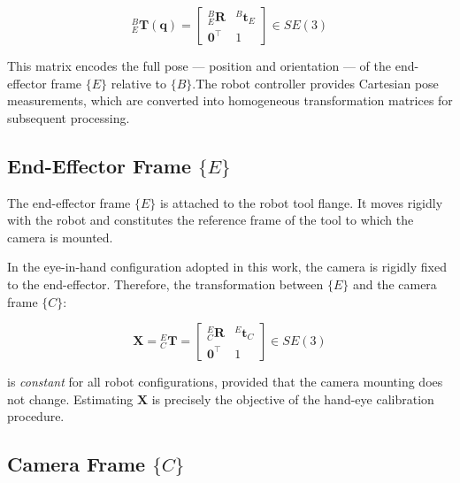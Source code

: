 \begin{equation}
    {}^B_E\mathbf{T}(\mathbf{q}) =
    \begin{bmatrix} {}^B_E\mathbf{R} & {}^B\mathbf{t}_E \\
    \mathbf{0}^{\top} & 1 \end{bmatrix} \in SE(3)
    \label{eq:T_BE}
\end{equation}

\noindent This matrix encodes the full pose — position and orientation — of the
end-effector frame $\{E\}$ relative to $\{B\}$.The robot controller provides Cartesian pose measurements, which are converted into homogeneous transformation matrices for subsequent processing.


\subsection{End-Effector Frame \texorpdfstring{$\{E\}$}{E}}
\label{subsec:frame_ee}

The end-effector frame $\{E\}$ is attached to the robot tool flange. It moves
rigidly with the robot and constitutes the reference frame of the tool to which
the camera is mounted.

In the eye-in-hand configuration adopted in this work, the camera is rigidly
fixed to the end-effector. Therefore, the transformation between $\{E\}$ and
the camera frame $\{C\}$:

\begin{equation}
    \mathbf{X} = {}^E_C\mathbf{T} =
    \begin{bmatrix} {}^E_C\mathbf{R} & {}^E\mathbf{t}_C \\
    \mathbf{0}^{\top} & 1 \end{bmatrix} \in SE(3)
    \label{eq:X_EC}
\end{equation}

\noindent is \textit{constant} for all robot configurations, provided that the
camera mounting does not change. Estimating $\mathbf{X}$ is precisely the
objective of the hand-eye calibration procedure. %

\subsection{Camera Frame \texorpdfstring{$\{C\}$}{C}}
\label{subsec:frame_camera}

